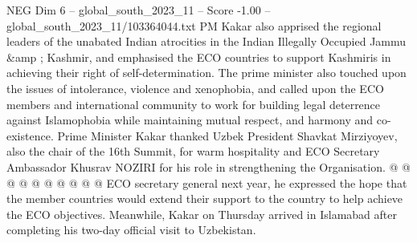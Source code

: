 \begin{textsample}{NEG Dim 6 – global\_south\_2023\_11 – Score -1.00 – global\_south\_2023\_11/103364044.txt}
PM Kakar also apprised the regional leaders of the unabated Indian atrocities in the Indian Illegally Occupied Jammu \&amp ; Kashmir, and emphasised the ECO countries to support Kashmiris in achieving their right of self-determination.
The prime minister also touched upon the issues of intolerance, violence and xenophobia, and called upon the ECO members and international community to work for building legal deterrence against Islamophobia while maintaining mutual respect, and harmony and co-existence.
Prime Minister Kakar thanked Uzbek President Shavkat Mirziyoyev, also the chair of the 16th Summit, for warm hospitality and ECO Secretary Ambassador Khusrav NOZIRI for his role in strengthening the Organisation. @ @ @ @ @ @ @ @ @ @ ECO secretary general next year, he expressed the hope that the member countries would extend their support to the country to help achieve the ECO objectives.
Meanwhile, Kakar on Thursday arrived in Islamabad after completing his two-day official visit to Uzbekistan.

\end{textsample}
